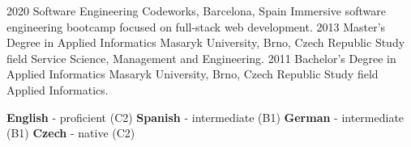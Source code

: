 \documentclass[9pt]{developercv}
\begin{document}

\begin{entrylist}
  \entry
  {2020}
  {Software Engineering}
  {Codeworks, Barcelona, Spain}
  {Immersive software engineering bootcamp focused on full-stack web development.}
  \entry
  {2013}
  {Master's Degree in Applied Informatics}
  {Masaryk University, Brno, Czech Republic}
  {Study field Service Science, Management and Engineering.}
  \entry
  {2011}
  {Bachelor's Degree  in Applied Informatics}
  {Masaryk University, Brno, Czech Republic}
  {Study field Applied Informatics.}
\end{entrylist}


\begin{minipage}[t]{1\textwidth}
  \vspace{-\baselineskip}


  \textbf{English} - proficient (C2)\hfill\slashsep\hfill
  \textbf{Spanish} - intermediate (B1)\hfill\slashsep\hfill
  \textbf{German} - intermediate (B1)\hfill\slashsep\hfill
  \textbf{Czech} - native (C2)


\end{minipage}
\end{document}
